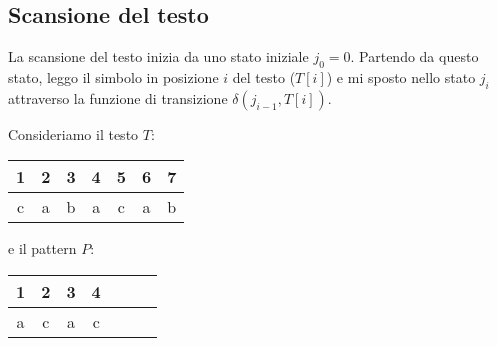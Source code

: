 \subsection{Scansione del testo}
La scansione del testo inizia da uno stato iniziale $j_0 = 0$. Partendo da questo
stato, leggo il simbolo in posizione $i$ del testo ($T[i]$) e mi sposto nello stato
$j_i$ attraverso la funzione di transizione $\delta(j_{i - 1}, T[i])$.
\begin{esempio}
    Consideriamo il testo $T$:
    \begin{table}[!ht]
        \centering
        \begin{tabular}{ccccccc}
            1                       & 2                      & 3                      & 4                      & 5                      & 6                      & 7                      \\ \hline
            \multicolumn{1}{|c|}{c} & \multicolumn{1}{c|}{a} & \multicolumn{1}{c|}{b} & \multicolumn{1}{c|}{a} & \multicolumn{1}{c|}{c} & \multicolumn{1}{c|}{a} & \multicolumn{1}{c|}{b} \\ \hline
        \end{tabular}
    \end{table}

    e il pattern $P$:
    \begin{table}[!ht]
        \centering
        \begin{tabular}{ccccccc}
            1                       & 2                      & 3                      & 4                      \\ \hline
            \multicolumn{1}{|c|}{a} & \multicolumn{1}{c|}{c} & \multicolumn{1}{c|}{a} & \multicolumn{1}{c|}{c} \\ \hline
        \end{tabular}
    \end{table}


\end{esempio}
